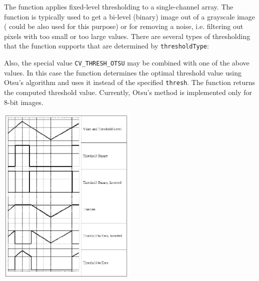 \begin{description}
\end{description}

The function applies fixed-level thresholding
to a single-channel array. The function is typically used to get a
bi-level (binary) image out of a grayscale image ( could
be also used for this purpose) or for removing a noise, i.e. filtering
out pixels with too small or too large values. There are several
types of thresholding that the function supports that are determined by
\texttt{thresholdType}:

\begin{description}
\end{description}

Also, the special value \texttt{CV\_THRESH\_OTSU} may be combined with
one of the above values. In this case the function determines the optimal threshold
value using Otsu's algorithm and uses it instead of the specified \texttt{thresh}.
The function returns the computed threshold value.
Currently, Otsu's method is implemented only for 8-bit images.

\includegraphics[width=0.5\textwidth]{pics/threshold.png}



